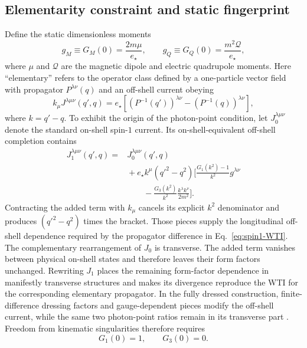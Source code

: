 \documentclass[12pt]{iopjournal}
\theoremstyle{definition}
\theoremstyle{remark}
\begin{document}
\subsection{Elementarity constraint and static fingerprint}

Define the static dimensionless moments
\begin{equation}
g_M\equiv G_M(0)=\frac{2m\mu}{e_\star},
\qquad
g_Q\equiv G_Q(0)=\frac{m^2\mathcal Q}{e_\star},
\end{equation}
where $\mu$ and $\mathcal Q$ are the magnetic dipole and electric quadrupole moments. Here ``elementary'' refers to the operator class defined by a one-particle vector field with propagator $P^{\lambda\nu}(q)$ and an off-shell current obeying \cite{Haberzettl2019}
\begin{equation}
k_\mu J^{\lambda\mu\nu}(q',q)
=e_\star\left[(P^{-1}(q'))^{\lambda\nu}-(P^{-1}(q))^{\lambda\nu}\right],
\label{eq:spin1-WTI}
\end{equation}
where $k=q'-q$. To exhibit the origin of the photon-point condition, let $J_0^{\lambda\mu\nu}$ denote the standard on-shell spin-$1$ current. Its on-shell-equivalent off-shell completion contains \cite{Haberzettl2019}
\begin{align}
J_1^{\lambda\mu\nu}(q',q)
={}&J_0^{\lambda\mu\nu}(q',q)
\nonumber\\
&{}+e_\star k^\mu(q'^2-q^2)
\biggl[
\frac{G_1(k^2)-1}{k^2}g^{\lambda\nu}
\nonumber\\
&\qquad
-\frac{G_3(k^2)}{k^2}
\frac{k^\lambda k^\nu}{2m^2}
\biggr].
\label{eq:spin1-completion}
\end{align}
Contracting the added term with $k_\mu$ cancels its explicit $k^2$ denominator and produces $(q'^2-q^2)$ times the bracket. Those pieces supply the longitudinal off-shell dependence required by the propagator difference in Eq.~\eqref{eq:spin1-WTI}. The complementary rearrangement of $J_0$ is transverse. The added term vanishes between physical on-shell states and therefore leaves their form factors unchanged. Rewriting $J_1$ places the remaining form-factor dependence in manifestly transverse structures and makes its divergence reproduce the WTI for the corresponding elementary propagator. In the fully dressed construction, finite-difference dressing factors and gauge-dependent pieces modify the off-shell current, while the same two photon-point ratios remain in its transverse part \cite{Haberzettl2019}. Freedom from kinematic singularities therefore requires
\begin{equation}
G_1(0)=1,
\qquad
G_3(0)=0.
\label{eq:spin1-regularity}
\end{equation}
\end{document}
